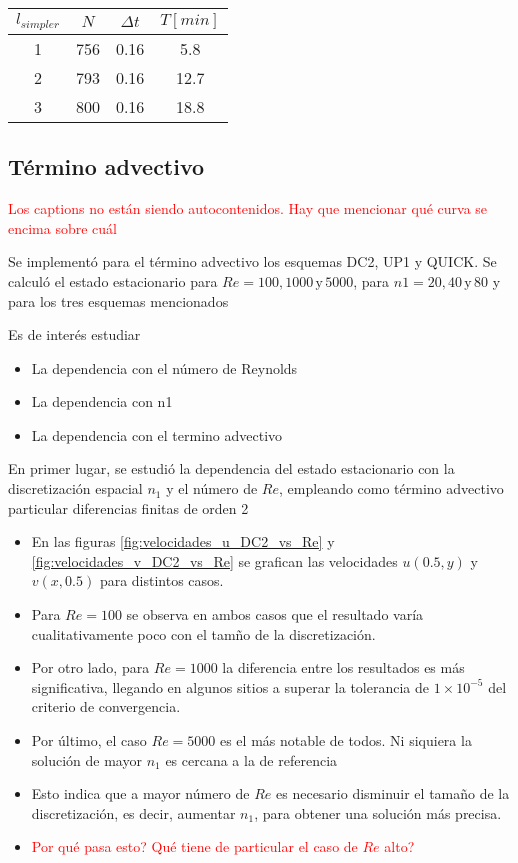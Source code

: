 \documentclass[aps,prb,twocolumn,superscriptaddress,floatfix,longbibliography,10pt]{revtex4-2}
\newif\ifptitle
\newif\ifpnumber
\newcounter{para}
\newcommand\ptitle[1]{\par\refstepcounter{para}
{\ifpnumber{\noindent\textcolor{lightgray}{\textbf{\thepara}}\indent}\fi}
{\ifptitle{\textbf{[{#1}]}}\fi}}
\begin{document}
\begin{table}[]
  \begin{tabular}{|c|c|c|c|}
  \hline
  \multicolumn{1}{|c|}{$l_{simpler}$ \quad} & \multicolumn{1}{c|}{$N$\quad} & \multicolumn{1}{c|}{$\Delta t$\quad} & \multicolumn{1}{c|}{$T [min]$} \\ \hline
  1 & 756 & 0.16 & 5.8 \\ \hline
  2 & 793 & 0.16 & 12.7 \\ \hline
  3 & 800 & 0.16 & 18.8 \\ \hline
  \end{tabular}
  \label{tabla:dt_costo_vs_lsimpler}
\end{table}


\subsection{Término advectivo}
\textcolor{red}{Los captions no están siendo autocontenidos. Hay que mencionar qué curva se encima sobre cuál}


Se implementó para el término advectivo los esquemas DC2, UP1 y QUICK. Se calculó el estado estacionario para $Re = 100, 1000 \, \mathrm{y} \, 5000$, para $n1 = 20, 40 \, \mathrm{y} \, 80$ y para los tres esquemas mencionados

Es de interés estudiar
\begin{itemize}
  \item La dependencia con el número de Reynolds
  \item La dependencia con n1
  \item La dependencia con el termino advectivo
\end{itemize}

\ptitle{Comparación DC2 vs n1 para distintos Re}
En primer lugar, se estudió la dependencia del estado estacionario con la discretización espacial $n_1$ y el número de $Re$, empleando como término advectivo particular diferencias finitas de orden 2
\begin{itemize}
  \item En las figuras \ref{fig:velocidades_u_DC2_vs_Re} y \ref{fig:velocidades_v_DC2_vs_Re} se grafican las velocidades $u(0.5,y)$ y $v(x,0.5)$ para distintos casos.
  \item Para $Re = 100$ se observa en ambos casos que el resultado varía cualitativamente poco con el tamño de la discretización.
  \item Por otro lado, para $Re = 1000$ la diferencia entre los resultados es más significativa, llegando en algunos sitios a superar la tolerancia de $1 \times 10^{-5}$ del criterio de convergencia.
  \item Por último, el caso $Re = 5000$ es el más notable de todos. Ni siquiera la solución de mayor $n_1$ es cercana a la de referencia
  \item Esto indica que a mayor número de $Re$ es necesario disminuir el tamaño de la discretización, es decir, aumentar $n_1$, para obtener una solución más precisa.
  \item \textcolor{red}{Por qué pasa esto? Qué tiene de particular el caso de $Re$ alto?}
\end{itemize}
\end{document}
